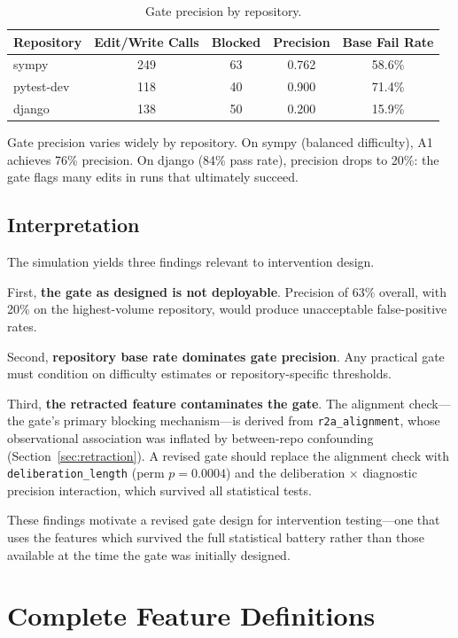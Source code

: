 \documentclass[11pt]{article}
\newcommand{\feat}[1]{\texttt{#1}}
\newcommand{\rtalign}{\feat{r2a\_alignment}}
\begin{document}
\begin{table}[t]
\centering
\caption{Gate precision by repository.}
\label{tab:gaterepo}
\small
\begin{tabular}{lcccc}
\toprule
\textbf{Repository} & \textbf{Edit/Write Calls} & \textbf{Blocked} & \textbf{Precision} & \textbf{Base Fail Rate} \\
\midrule
sympy      & 249 & 63 & 0.762 & 58.6\% \\
pytest-dev & 118 & 40 & 0.900 & 71.4\% \\
django     & 138 & 50 & 0.200 & 15.9\% \\
\bottomrule
\end{tabular}
\end{table}

Gate precision varies widely by repository.
On sympy (balanced difficulty), A1 achieves 76\% precision.
On django (84\% pass rate), precision drops to 20\%: the gate flags many edits in runs that ultimately succeed.

\subsection{Interpretation}

The simulation yields three findings relevant to intervention design.

First, \textbf{the gate as designed is not deployable}.
Precision of 63\% overall, with 20\% on the highest-volume repository, would produce unacceptable false-positive rates.

Second, \textbf{repository base rate dominates gate precision}.
Any practical gate must condition on difficulty estimates or repository-specific thresholds.

Third, \textbf{the retracted feature contaminates the gate}.
The alignment check---the gate's primary blocking mechanism---is derived from \rtalign{}, whose observational association was inflated by between-repo confounding (Section~\ref{sec:retraction}).
A revised gate should replace the alignment check with \feat{deliberation\_length} (perm $p = 0.0004$) and the deliberation $\times$ diagnostic precision interaction, which survived all statistical tests.

These findings motivate a revised gate design for intervention testing---one that uses the features which survived the full statistical battery rather than those available at the time the gate was initially designed.


\section{Complete Feature Definitions}
\label{app:features}
\end{document}
